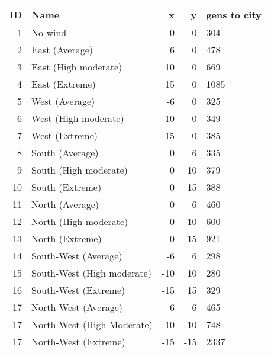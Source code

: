 \documentclass{article}
\begin{document}
  \begin{table}[h]
    \begin{tabular}{|r|l|r|r|l|}
    \hline
    ID & Name & x  & y & gens to city \\ \hline
    1 & No wind & 0 & 0 & 304                 \\ \hline
    2 & East (Average)  & 6 & 0 & 478                 \\ \hline
    3 & East (High moderate) & 10 & 0 & 669                 \\ \hline
    4 & East (Extreme) & 15 & 0 & 1085                 \\ \hline
    5 & West (Average)  & -6 & 0 & 325                 \\ \hline
    6 & West (High moderate) & -10 & 0 & 349                 \\ \hline
    7 & West (Extreme) & -15 & 0 & 385                 \\ \hline
    8 & South (Average)  & 0 & 6 & 335                 \\ \hline
    9 & South (High moderate)  & 0 & 10 & 379                 \\ \hline
    10 & South (Extreme)  & 0 & 15 & 388                 \\ \hline
    11 & North (Average)  & 0 & -6 & 460                 \\ \hline
    12 & North (High moderate)  & 0 & -10 & 600                 \\ \hline
    13 & North (Extreme)  & 0 & -15 & 921                 \\ \hline

    14 & South-West (Average)  & -6 & 6 & 298                 \\ \hline
    15 & South-West (High moderate)  & -10 & 10 & 280                 \\ \hline
    16 & South-West (Extreme)  & -15 & 15 & 329                 \\ \hline
    17 & North-West (Average) & -6 & -6 & 465                \\ \hline
    17 & North-West (High Moderate) & -10 & -10 & 748                \\ \hline
    17 & North-West (Extreme) & -15 & -15 & 2337                \\ \hline

    
    \end{tabular}
    \end{table}
\end{document}
